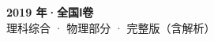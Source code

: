 \documentclass[zihao=-4, a4paper]{ctexart}
\begin{document}
\begin{center}
  {\Large\bfseries 2019 年·全国Ⅰ卷}\\[4pt]
  {\large 理科综合 · 物理部分 · 完整版（含解析）}
\end{center}
\medskip
{}

\clearpage
{}

\clearpage
{}

\end{document}
